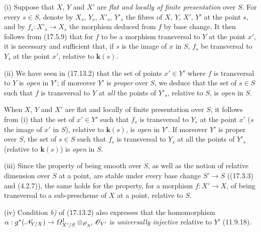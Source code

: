 \begin{remarks}[17.13.4]
\label{IV.17.13.4}
(i) Suppose that $X$, $Y$ and $X'$ are \emph{flat and locally of finite presentation} over $S$. For every $s\in S$, denote by $X_s$, $Y_s$, $X'_s$, $Y'_s$ the fibres of $X$, $Y$, $X'$, $Y'$ at the point $s$, and by $f_s:X'_s\to X_s$ the morphism deduced from $f$ by base change. It then follows from (17.5.9) that for $f$ to be a morphism transversal to $Y$ at the point $x'$, it is necessary and sufficient that, if $s$ is the image of $x$ in $S$, $f_s$ be transversal to $Y_s$ at the point $x'$, relative to $\boldsymbol{k}(s)$.

(ii) We have seen in (17.13.2) that the set of points $x'\in Y'$ where $f$ is transversal to $Y$ is \emph{open} in $Y'$; if moreover $Y'$ is \emph{proper} over $S$, we deduce that the set of $s\in S$ such that $f$ is transversal to $Y$ at \emph{all} the points of $Y'_s$, relative to $S$, is \emph{open} in $S$.

When $X$, $Y$ and $X'$ are flat and locally of finite presentation over $S$, it follows from (i) that the set of $x'\in Y'$ such that $f_s$ is transversal to $Y_s$ at the point $x'$ ($s$ the image of $x'$ in $S$), relative to $\boldsymbol{k}(s)$, is \emph{open} in $Y'$. If moreover $Y'$ is proper over $S$, the set of $s\in S$ such that $f_s$ is transversal to $Y_s$ at all the points of $Y'_s$ (relative to $\boldsymbol{k}(s)$) is \emph{open} in $S$.

(iii) Since the property of being smooth over $S$, as well as the notion of relative dimension over $S$ at a point, are stable under every base change $S'\to S$ ((17.3.3) and (4.2.7)), the same holds for the property, for a morphism $f:X'\to X$, of being transversal to a sub-prescheme of $X$ at a point, relative to $S$.


(iv) Condition \emph{b)} of (17.13.2) also expresses that the homomorphism $\alpha:g^*(\mathscr{N}_{Y/X})\to\varOmega^1_{X'/S}\otimes_{\mathscr{O}_{X'}}\mathscr{O}_{Y'}$ is \emph{universally injective} relative to $Y'$ (11.9.18).
\end{remarks}

